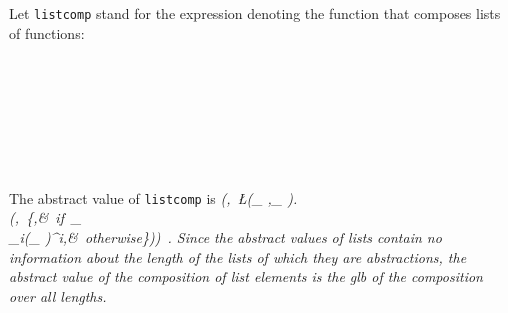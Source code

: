 Let \mbox{\tt listcomp} stand for the expression denoting the function
that composes lists of functions:
\begin{flushleft}
\vspace{-0.0em}\vspace{-0.0em}\\
\vspace{-0.0em}\\
\vspace{-0.0em}\\
\vspace{-0.0em}\\
\vspace{-0.0em}\\
\vspace{-0.0em}\\
\vspace{-0.0em}
\end{flushleft}
The abstract value of \mbox{\tt listcomp} is
\beqs
\it (\ID,\ \L(\A_{ },\K_{ }).\\
\it (\ID,\ \left\{\bot,&\it \mbox{\rm\ if}\ \A_{ }\neq\SPINE\ \ID\\
\it \glb_{i}(\K_{ })^i,&\it \mbox{\rm\ otherwise}\ea\right\}))\ .
\eeqs
Since the abstract values of lists contain no information about the
length of the lists of which they are abstractions, the abstract value
of the composition of list elements is the glb of the composition over
all lengths.

